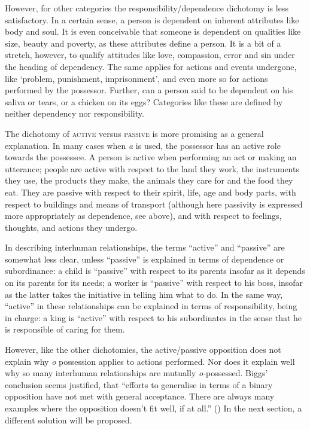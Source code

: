 However, for other categories the responsibility/dependence dichotomy is less satisfactory. In a certain sense, a person is dependent on inherent attributes like body and soul. It is even conceivable that someone is dependent on qualities like size, beauty and poverty, as these attributes define a person. It is a bit of a stretch, however, to qualify attitudes like love, compassion, error and sin under the heading of dependency. The same applies for actions and events undergone, like ‘problem, punishment, imprisonment’, and even more so for actions performed by the possessor. Further, can a person said to be dependent on his saliva or tears, or a chicken on its eggs? Categories like these are defined by neither dependency nor responsibility.

The dichotomy of \textsc{active} versus \textsc{passive} is more promising as a general explanation. In many cases when \textit{{\ꞌ}a} is used, the possessor has an active role towards the possessee. A person is active when performing an act or making an utterance; people are active with respect to the land they work, the instruments they use, the products they make, the animals they care for and the food they eat. They are passive with respect to their spirit, life, age and body parts, with respect to buildings and means of transport (although here passivity is expressed more appropriately as dependence, see above), and with respect to feelings, thoughts, and actions they undergo.

In describing interhuman relationships, the terms “active” and “passive” are somewhat less clear, unless “passive” is explained in terms of dependence or subordinance: a child is “passive” with respect to its parents insofar as it depends on its parents for its needs; a worker is “passive” with respect to his boss, insofar as the latter takes the initiative in telling him what to do. In the same way, “active” in these relationships can be explained in terms of responsibility, being in charge: a king is “active” with respect to his subordinates in the sense that he is responsible of caring for them.

However, like the other dichotomies, the active/passive opposition does not explain why \textit{o} possession applies to actions performed. Nor does it explain well why so many interhuman relationships are mutually \textit{o-}possessed. Biggs’ conclusion seems justified, that “efforts to generalise in terms of a binary opposition have not met with general acceptance. There are always many examples where the opposition doesn’t fit well, if at all.” (\citealt{Biggs2000}) In the next section, a different solution will be proposed.

